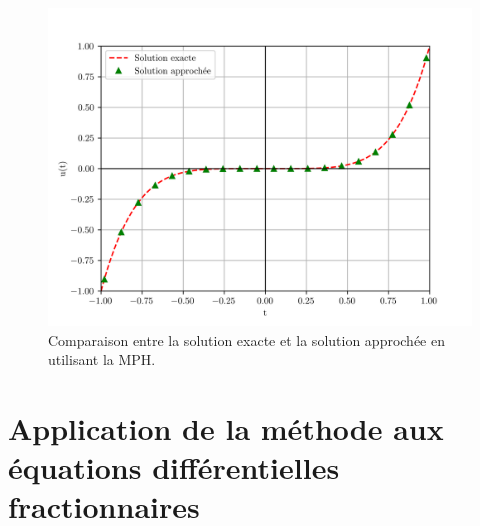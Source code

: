 \begin{figure}[H]
    \centering
    \includegraphics[scale = 0.7]{IMAGES/plot (2).png}
    \caption{Comparaison entre la solution exacte et la solution approchée en utilisant la MPH.}
\end{figure}



\section{Application de la méthode aux équations différentielles fractionnaires}
